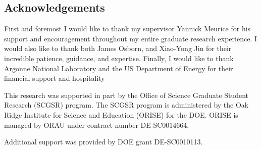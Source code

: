 \begin{doublespace}

\chapter*{Acknowledgements}
First and foremost I would like to thank my supervisor Yannick Meurice for his
support and encouragement throughout my entire graduate research experience.
%
I would also like to thank both James Osborn, and Xiao-Yong Jin for their
incredible patience, guidance, and expertise.
%
Finally, I would like to thank Argonne National Laboratory and the US
Department of Energy for their financial support and hospitality 



This research was supported in part by the Office of Science Graduate Student
Research (SCGSR) program. The SCGSR program is administered by the Oak Ridge
Institute for Science and Education (ORISE) for the DOE. ORISE is managed by
ORAU under contract number DE‐SC0014664.

Additional support was provided by DOE grant DE-SC0010113.





\end{doublespace}
